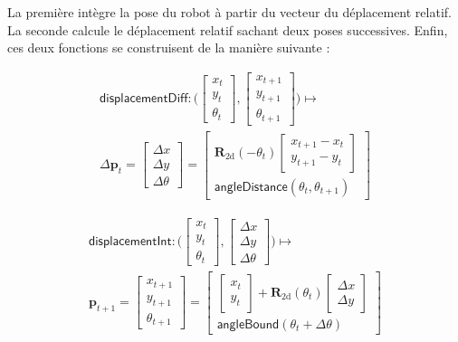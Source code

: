 La première intègre la pose du robot à partir du vecteur du déplacement relatif.
La seconde calcule le déplacement relatif sachant deux poses successives.
Enfin, ces deux fonctions se construisent de la manière suivante :

\begin{gather*}
\mathsf{displacementDiff} : 
\big(\begin{bmatrix}x_{t} \\ y_{t} \\ \theta_{t}\end{bmatrix},
\begin{bmatrix}x_{t+1} \\ y_{t+1} \\ \theta_{t+1}\end{bmatrix}\big)
\longmapsto \\
\Delta \bm{p}_{t} = \begin{bmatrix}\Delta x \\ \Delta y \\ \Delta \theta \end{bmatrix}
= 
\begin{bmatrix} 
\bm{R}_{\text{2d}}(-\theta_{t})\begin{bmatrix}x_{t+1}-x_{t} \\ y_{t+1}-y_{t}\end{bmatrix} \\ 
\mathsf{angleDistance}(\theta_{t}, \theta_{t+1}) 
\end{bmatrix}
\end{gather*}

\begin{gather*}
\mathsf{displacementInt} : 
\big(\begin{bmatrix}x_{t} \\ y_{t} \\ \theta_{t}\end{bmatrix},
\begin{bmatrix}\Delta x \\ \Delta y \\ \Delta \theta\end{bmatrix}\big)
\longmapsto \\
\bm{p}_{t+1} = \begin{bmatrix}x_{t+1} \\ y_{t+1} \\ \theta_{t+1}\end{bmatrix}
= 
\begin{bmatrix}
\begin{bmatrix}x_{t} \\ y_{t}\end{bmatrix} + \bm{R}_{\text{2d}}(\theta_{t})\begin{bmatrix}\Delta x \\ \Delta y\end{bmatrix}\\
\mathsf{angleBound}(\theta_{t} + \Delta \theta) 
\end{bmatrix}
\end{gather*}

